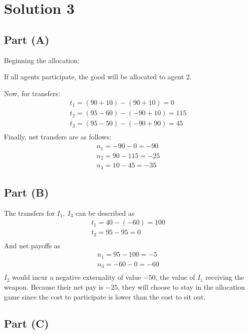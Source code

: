 \documentclass[10pt,a4paper]{article}
\begin{document}
\section*{Solution 3}
  \subsection*{Part (A)}
    Beginning the allocation:
    
    If all agents participate, the good will be allocated to agent 2.

    Now, for transfers:
    \begin{gather*}
      t_1 = (90+10) - (90+10) = 0 \\
      t_2 = (95-60) - (-90+10) = 115 \\
      t_3 = (95-50) - (-90+90) = 45 \\
    \end{gather*}
    Finally, net transfers are as follows:
    \begin{gather*}
      n_1 = -90 - 0 = -90 \\
      n_2 = 90 - 115 = -25 \\
      n_3 = 10 - 45 = -35
    \end{gather*}
  \subsection*{Part (B)}
    The transfers for $I_1, \ I_3$ can be described as 
    \begin{gather*}
      t_1 = 40 - (-60) = 100 \\
      t_3 = 95 - 95 = 0 \\
    \end{gather*}
    And net payoffs as
    \begin{gather*}
      n_1 = 95 - 100 = -5 \\
      n_3 = -60 -0 = -60 \\
    \end{gather*}
    $I_2$ would incur a negative externality of value $-50$, the value of $I_1$ receiving the weapon. Because their net pay is $-25$, they will choose to stay in the allocation game since the cost to participate is lower than the cost to sit out. 
  \subsection*{Part (C)}
\end{document}
